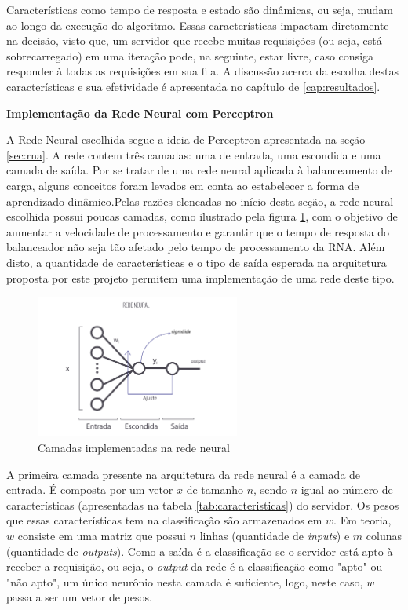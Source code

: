Características como tempo de resposta e estado são dinâmicas, ou seja, mudam ao longo da execução do algoritmo. Essas características impactam diretamente na decisão, visto que, um servidor que recebe muitas requisições (ou seja, está sobrecarregado) em uma iteração pode, na seguinte, estar livre, caso consiga responder à todas as requisições em sua fila. 
A discussão acerca da escolha destas características e sua efetividade é apresentada no capítulo de \ref{cap:resultados}.

\textbf{Implementação da Rede Neural com Perceptron}


A Rede Neural escolhida segue a ideia de Perceptron apresentada na seção \ref{sec:rna}. A rede contem três camadas: uma de entrada, uma escondida e uma camada de saída. Por se tratar de uma rede neural aplicada à balanceamento de carga, alguns conceitos foram levados em conta ao estabelecer a forma de aprendizado dinâmico.Pelas razões elencadas no início desta seção, a rede neural escolhida possui poucas camadas, como ilustrado pela figura \ref{fig:rede}, com o objetivo de aumentar a velocidade de processamento e garantir que o tempo de resposta do balanceador não seja tão afetado pelo tempo de processamento da RNA. Além disto, a quantidade de características e o tipo de saída esperada na arquitetura proposta por este projeto permitem uma implementação de uma rede deste tipo. 

\begin{figure}[htb]
	\caption{\label{fig:rede} Camadas implementadas na rede neural}
	\begin{center}
		\includegraphics[width=0.60\textwidth]{img/redeusada.png}
	\end{center}
\end{figure}

A primeira camada presente na arquitetura da rede neural é a camada de entrada. É composta por um vetor $x$ de tamanho $n$, sendo $n$ igual ao número de características (apresentadas na tabela \ref{tab:caracteristicas}) do servidor. Os pesos que essas características tem na classificação são armazenados em $w$. Em teoria, $w$ consiste em uma matriz que possui $n$ linhas (quantidade de \textit{inputs}) e $m$ colunas (quantidade de \textit{outputs}). Como a saída é a classificação se o servidor está apto à receber a requisição, ou seja, o \textit{output} da rede é a classificação como "apto" ou "não apto", um único neurônio nesta camada é suficiente, logo, neste caso, $w$ passa a ser um vetor de pesos. 

